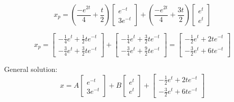 \documentclass[12pt]{article}
\begin{document}
\[x_p = \left(\frac{-e^{2t}}{4} + \frac{t}{2}\right)\begin{bmatrix}
    e^{-t}\\
    3e^{-t}
\end{bmatrix} + \left(\frac{-e^{2t}}{4} + \frac{3t}{2}\right) \begin{bmatrix}
    e^t\\
    e^t
\end{bmatrix}\]

\[x_p = \begin{bmatrix}
    -\frac{1}{4}e^t + \frac{1}{2}te^{-t}\\
    -\frac{3}{4}e^t + \frac{3}{2}te^{-t}
\end{bmatrix} + \begin{bmatrix}
    -\frac{1}{4}e^t + \frac{3}{2}te^{-t}\\
    -\frac{3}{4}e^t + \frac{9}{2}te^{-t}
\end{bmatrix} = \begin{bmatrix}
    -\frac{1}{2}e^t + 2te^{-t}\\
    -\frac{3}{2}e^t + 6te^{-t}
\end{bmatrix}\]

General solution:
\[\boxed{x = A\begin{bmatrix}
    e^{-t}\\
    3e^{-t}
\end{bmatrix} + B \begin{bmatrix}
    e^t\\
    e^t
\end{bmatrix} + \begin{bmatrix}
    -\frac{1}{2}e^t + 2te^{-t}\\
    -\frac{3}{2}e^t + 6te^{-t}
\end{bmatrix}}\]

\pagebreak
\end{document}
